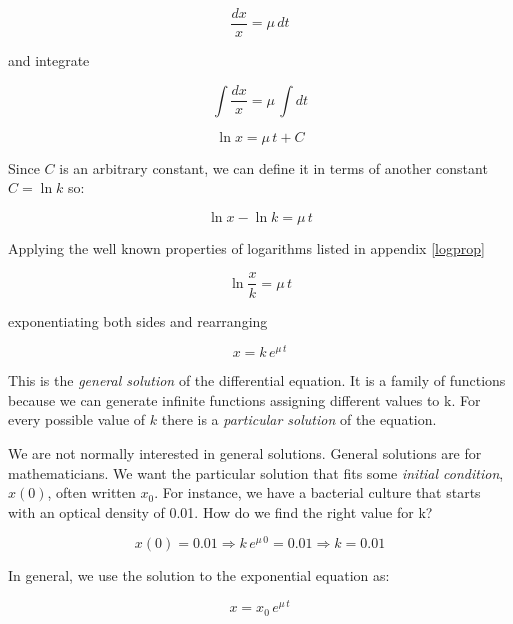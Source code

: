 \documentclass[12pt]{article}
\begin{document}
\begin{equation}
	\frac{dx}{x} = \mu \, dt \nonumber
\end{equation}

and integrate

\begin{equation}
	\int \frac{dx}{x} = \mu \, \int  dt \nonumber
\end{equation}

\begin{equation}
	\ln{x} = \mu \, t + C \nonumber
\end{equation}

Since $C$ is an arbitrary constant, we can define it in terms of another constant $C= \ln{k}$ so:

\begin{equation}
	\ln{x} - \ln{k}  = \mu \, t  \nonumber
\end{equation}

Applying the well known properties of logarithms listed in appendix \ref{logprop}

\begin{equation}
	\ln{\frac{x}{k}}   = \mu \, t \nonumber
\end{equation}

exponentiating both sides and rearranging

\begin{equation}
	x   = k \, e^{\mu \, t} \nonumber
\end{equation}

This is the \emph{general solution} of the differential equation. It is a family of functions because we can generate infinite functions assigning different values to k. For every possible value of $k$ there is a \emph{particular solution} of the equation.

We are not normally interested in general solutions. General solutions are for mathematicians. We want the particular solution that fits some \emph{initial condition}, $x(0)$, often written $x_0$. For instance, we have a bacterial culture that starts with an optical density of 0.01. How do we find the right value for k?


\begin{equation}
x(0) = 0.01 \Rightarrow	 k \, e^{\mu \, 0} = 0.01 \Rightarrow	k=0.01 \nonumber
\end{equation}

In general, we use the solution to the exponential equation as:

\begin{equation}
	x   = x_0 \, e^{\mu \, t} \nonumber
\end{equation}
\end{document}
